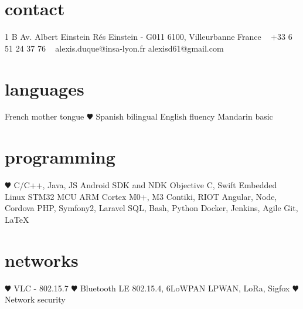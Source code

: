 \documentclass[]{cv-style}          %
\begin{document}
\lastupdated


\begin{aside}
%
\section{contact}
1 B Av. Albert Einstein
Rés Einstein - G011
6100, Villeurbanne
France
~
+33 6 51 24 37 76
~
alexis.duque@insa-lyon.fr
alexisd61@gmail.com
%
\section{languages}
French mother tongue
{\color{red} $\varheartsuit$} Spanish bilingual
English fluency
Mandarin basic
%
\section{programming}
{\color{red} $\varheartsuit$} C/C++, Java, JS
Android SDK and NDK
Objective C, Swift
Embedded Linux
STM32 MCU
ARM Cortex M0+, M3
Contiki, RIOT
Angular, Node, Cordova
PHP, Symfony2, Laravel
SQL, Bash, Python
Docker, Jenkins, Agile
Git, \LaTeX{}
%
\section{networks}
{\color{red} $\varheartsuit$} VLC - 802.15.7
{\color{red} $\varheartsuit$} Bluetooth LE
802.15.4, 6LoWPAN
LPWAN, LoRa, Sigfox
{\color{red} $\varheartsuit$} Network security
%
\end{aside}





\vspace{0.15cm}
\end{document}
